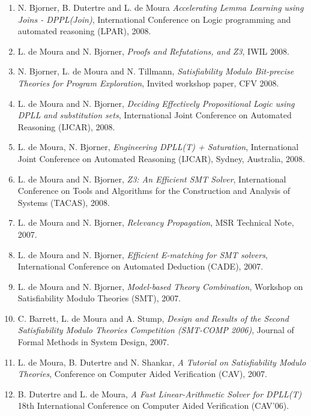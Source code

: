 \documentclass{article}
\begin{document}
\begin{enumerate}
\item N. Bjorner, B. Dutertre and L. de Moura
{\em Accelerating Lemma Learning using Joins - DPPL(Join)},
International Conference on Logic programming and automated reasoning (LPAR), 2008.

\item L. de Moura and  N. Bjorner,
{\em Proofs and Refutations, and Z3},
IWIL 2008.

\item N. Bjorner, L. de Moura and N. Tillmann,
{\em Satisfiability Modulo Bit-precise Theories for Program Exploration},
Invited workshop paper, CFV 2008.

\item L. de Moura and N. Bjorner,
{\em Deciding Effectively Propositional Logic using DPLL and substitution sets},
International Joint Conference on Automated Reasoning (IJCAR), 2008.

\item L. de Moura, N. Bjorner,
{\em Engineering DPLL(T) + Saturation},
International Joint Conference on Automated Reasoning (IJCAR), Sydney, Australia, 2008.

\item L. de Moura and N. Bjorner,
{\em Z3: An Efficient SMT Solver},
International Conference on Tools and Algorithms for the Construction and Analysis of Systems (TACAS), 2008.

\item L. de Moura and N. Bjorner, {\em Relevancy Propagation}, MSR Technical Note, 2007.

\item L. de Moura and N. Bjorner, {\em Efficient E-matching for SMT solvers}, International Conference on Automated Deduction (CADE), 2007.

\item L. de Moura and N. Bjorner, {\em Model-based Theory Combination}, Workshop on Satisfiability Modulo Theories (SMT), 2007.

\item C. Barrett, L. de Moura and A. Stump,
{\em Design and Results of the Second Satisfiability Modulo Theories Competition (SMT-COMP 2006)}, Journal of Formal Methods in System Design, 2007.

\item L. de Moura, B. Dutertre and N. Shankar,
{\em A Tutorial on Satisfiability Modulo Theories}, Conference on Computer Aided Verification (CAV), 2007.

\item B. Dutertre and L. de Moura,
{\em A Fast Linear-Arithmetic Solver for DPLL(T)}
18th International Conference on Computer Aided Verification (CAV'06).


\end{enumerate}
\end{document}

